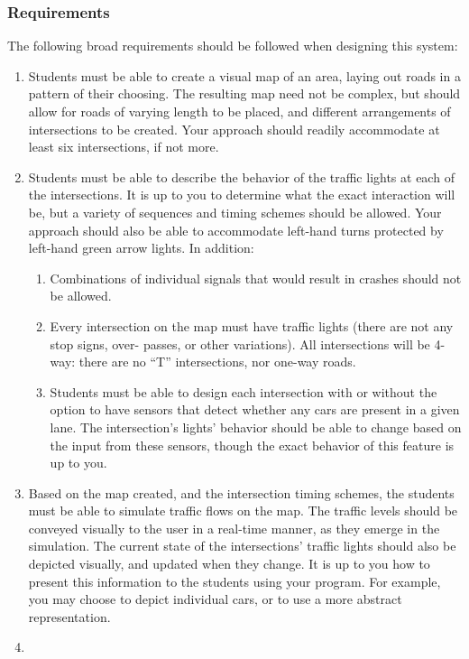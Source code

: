 \subsubsection*{Requirements}
The following broad requirements should be followed when designing this system:
\begin{enumerate}
\item
Students must be able to create a visual map of an area, laying out roads in a pattern of their choosing. The resulting map need not be complex, but should allow for roads of varying length to be placed, and different arrangements of intersections to be created. Your approach should readily accommodate at least six intersections, if not more.
\item
Students must be able to describe the behavior of the traffic lights at each of the intersections. It is up to you to determine what the exact interaction will be, but a variety of sequences and timing schemes should be allowed. Your approach should also be able to accommodate left-hand turns protected by left-hand green arrow lights. In addition:
\begin{enumerate}
\item
Combinations of individual signals that would result in crashes should not be allowed.
\item
Every intersection on the map must have traffic lights (there are not any stop signs, over- passes, or other variations). All intersections will be 4-way: there are no ``T'' intersections, nor one-way roads.
\item
Students must be able to design each intersection with or without the option to have sensors that detect whether any cars are present in a given lane. The intersection's lights' behavior should be able to change based on the input from these sensors, though the exact behavior of this feature is up to you.
\end{enumerate}
\item
Based on the map created, and the intersection timing schemes, the students must be able to simulate traffic flows on the map. The traffic levels should be conveyed visually to the user in a real-time manner, as they emerge in the simulation. The current state of the intersections' traffic lights should also be depicted visually, and updated when they change. It is up to you how to present this information to the students using your program. For example, you may choose to depict individual cars, or to use a more abstract representation.
\item

\end{enumerate}
